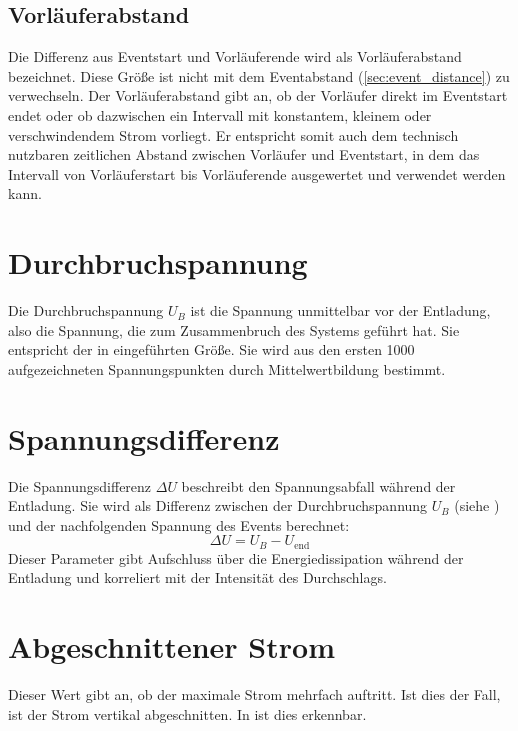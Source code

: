 \subsection{Vorläuferabstand}
\label{sec:precursor_distance}
Die Differenz aus Eventstart und Vorläuferende wird als Vorläuferabstand bezeichnet. Diese Größe ist nicht mit dem Eventabstand (\ref{sec:event_distance}) zu verwechseln. Der Vorläuferabstand gibt an, ob der Vorläufer direkt im Eventstart endet oder ob dazwischen ein Intervall mit konstantem, kleinem oder verschwindendem Strom vorliegt. Er entspricht somit auch dem technisch nutzbaren zeitlichen Abstand zwischen Vorläufer und Eventstart, in dem das Intervall von Vorläuferstart bis Vorläuferende ausgewertet und verwendet werden kann.


\section{Durchbruchspannung}
\label{sec:breakdownvoltage}
Die Durchbruchspannung \(U_B\) ist die Spannung unmittelbar vor der Entladung, also die Spannung, die zum Zusammenbruch des Systems geführt hat. Sie entspricht der in  eingeführten Größe. Sie wird aus den ersten 1000 aufgezeichneten Spannungspunkten durch Mittelwertbildung bestimmt. 


\section{Spannungsdifferenz}
\label{sec:voltage_drop}
Die Spannungsdifferenz \(\Delta U\) beschreibt den Spannungsabfall während der Entladung. Sie wird als Differenz zwischen der Durchbruchspannung \(U_B\) (siehe ) und der nachfolgenden Spannung des Events berechnet:
\begin{equation}
\Delta U = U_B - U_{\text{end}}
\end{equation}
Dieser Parameter gibt Aufschluss über die Energiedissipation während der Entladung und korreliert mit der Intensität des Durchschlags. 

\section{Abgeschnittener Strom}
\label{sec:cutoffcurrent}
Dieser Wert gibt an, ob der maximale Strom mehrfach auftritt. Ist dies der Fall, ist der Strom vertikal abgeschnitten. In  ist dies erkennbar. 

